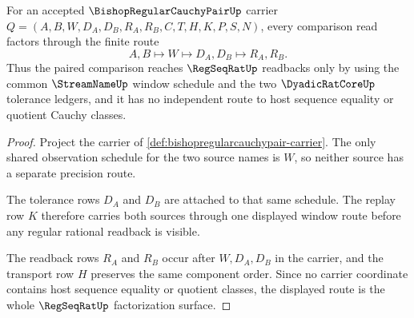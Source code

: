 \begin{theorem}
\label{thm:bishopregularcauchypair-regseqrat-factorization}
For an accepted $\BishopRegularCauchyPairUp$ carrier $Q=(A,B,W,D_A,D_B,R_A,R_B,C,T,H,K,P,S,N)$, every comparison read factors through the finite route
$$
A,B \longmapsto W \longmapsto D_A,D_B \longmapsto R_A,R_B .
$$
Thus the paired comparison reaches $\RegSeqRatUp$ readbacks only by using the common $\StreamNameUp$ window schedule and the two $\DyadicRatCoreUp$ tolerance ledgers, and it has no independent route to host sequence equality or quotient Cauchy classes.
\end{theorem}
\begin{proof}
Project the carrier of \autoref{def:bishopregularcauchypair-carrier}. The only shared observation schedule for the two source names is $W$, so neither source has a separate precision route.

The tolerance rows $D_A$ and $D_B$ are attached to that same schedule. The replay row $K$ therefore carries both sources through one displayed window route before any regular rational readback is visible.

The readback rows $R_A$ and $R_B$ occur after $W,D_A,D_B$ in the carrier, and the transport row $H$ preserves the same component order. Since no carrier coordinate contains host sequence equality or quotient classes, the displayed route is the whole $\RegSeqRatUp$ factorization surface.
\end{proof}

